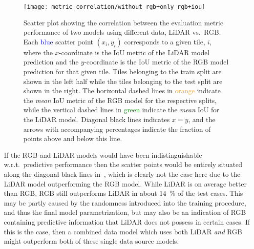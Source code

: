 \begin{figure}[H]
  \centering
  \texttt{[image: metric\_correlation/without\_rgb+only\_rgb+iou]}
  \caption{%
    Scatter plot showing the correlation between the evaluation metric performance of two models using different data, LiDAR vs.\ RGB\@.
    Each \textcolor{blue}{blue} scatter point $(x_i, y_i)$ corresponds to a given tile, $i$, where the $x$-coordinate is the IoU metric of the LiDAR model prediction and the $y$-coordinate is the IoU metric of the RGB model prediction for that given tile.
    Tiles belonging to the train split are shown in the left half while the tiles belonging to the test split are shown in the right.
    The horizontal dashed lines in \textcolor{orange}{orange} indicate the \emph{mean} IoU metric of the RGB model for the respective splits, while the vertical dashed lines in \textcolor{green}{green} indicate the \emph{mean} IoU for the LiDAR model.
    Diagonal \textcolor{black}{black} lines indicates $x = y$, and the arrows with accompanying percentages indicate the fraction of points above and below this line.
  }%
  \label{fig:rgb-lidar-correlation}\label{fig:correlation-explanation}
\end{figure}

If the RGB and LiDAR models would have been indistinguishable w.r.t.\ predictive performance then the scatter points would be entirely situated along the diagonal black lines in~, which is clearly not the case here due to the LiDAR model outperforming the RGB model.
While LiDAR is on average better than RGB, RGB still outperforms LiDAR in about \SI{14}{\percent} of the test cases.
This may be partly caused by the randomness introduced into the training procedure, and thus the final model parametrization, but may also be an indication of RGB containing predictive information that LiDAR does not possess in certain cases.
If this is the case, then a combined data model which uses both LiDAR \emph{and} RGB might outperform both of these single data source models.

